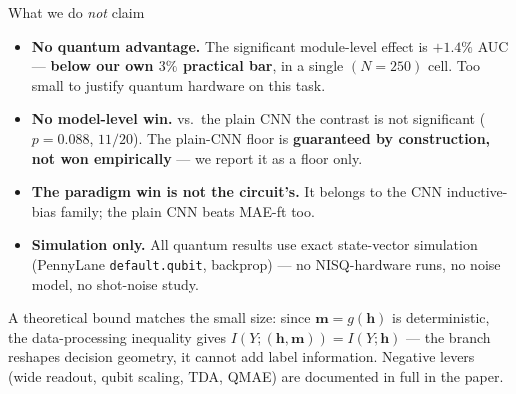 \documentclass[aspectratio=169,10pt]{beamer}
\newcommand{\bd}[1]{\textcolor{bad}{#1}}
\begin{document}
\begin{frame}{What we do \emph{not} claim}
\begin{itemize}
\item \alert{\textbf{No quantum advantage.}} The significant module-level effect is
      $+1.4\%$ AUC --- \textbf{below our own $3\%$ practical bar}, in a single
      $(N{=}250)$ cell. Too small to justify quantum hardware on this task.
\item \textbf{No model-level win.} vs.\ the plain CNN the contrast is
      \bd{not significant} ($p{=}0.088$, $11/20$). The plain-CNN floor is
      \textbf{guaranteed by construction, not won empirically} ---
      we report it as a floor only.
\item \textbf{The paradigm win is not the circuit's.} It belongs to the CNN
      inductive-bias family; the plain CNN beats MAE-ft too.
\item \textbf{Simulation only.} All quantum results use exact state-vector
      simulation (PennyLane \texttt{default.qubit}, backprop) --- no NISQ-hardware
      runs, no noise model, no shot-noise study.
\end{itemize}
\smallskip

\footnotesize
A theoretical bound matches the small size: since $\mathbf{m}=g(\mathbf{h})$ is
deterministic, the data-processing inequality gives
$I(Y;(\mathbf{h},\mathbf{m}))=I(Y;\mathbf{h})$ --- the branch reshapes decision
geometry, it cannot add label information. Negative levers (wide readout, qubit
scaling, TDA, QMAE) are documented in full in the paper.
\end{frame}
\end{document}
